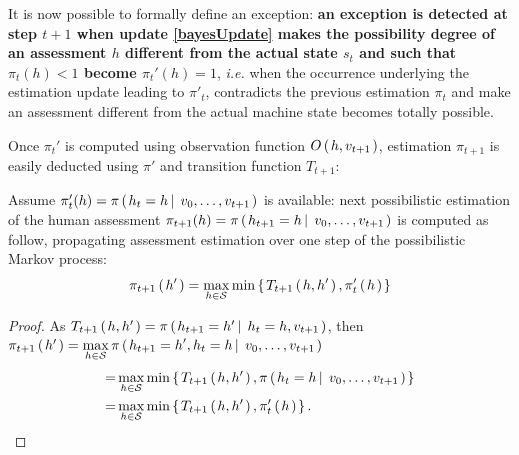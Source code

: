 It is now possible to formally define an exception: 
\textbf{an exception is detected at step $t+1$ 
when update \ref{bayesUpdate} 
makes the possibility degree of an assessment $h$
different from the actual state $s_t$ and 
such that $\pi_t(h)<1$ 
become $\pi_t'(h)=1$}, 
\textit{i.e.} when the occurrence underlying 
the estimation update leading to $\pi'_t$,
contradicts the previous estimation $\pi_t$ and
make an assessment different from the actual machine
state becomes totally possible.

Once $\pi_t'$ is computed 
using observation function $O \left( \left. h,v_{t+1} \right. \right)$, 
estimation $\pi_{t+1}$ is easily deducted 
using $\pi'$ and transition function $T_{t+1}$:
\begin{theorem}
Assume $\pi_t'(h)=\pi \left( \left.  h_t=h \, \right| \left. \, v_0, \ldots, v_{t+1}  \right. \right)$ 
is available: 
next possibilistic estimation of the human assessment 
$\pi_{t+1}(h) = \pi \left( \left.  h_{t+1} = h \, \right| \left. \, v_0, \ldots, v_{t+1}  \right. \right)$ 
is computed as follow, propagating assessment estimation
over one step of the possibilistic Markov process:
\begin{equation} 
\label{recestimH}
\pi_{t+1} \left( \left. h' \right. \right) = \max_{h \in \mathcal{S}} \min \left\{ \left.  T_{t+1} \left( \left. h, h' \right. \right), \pi_t' \left( \left.  h  \right. \right)   \right. \right\} 
\end{equation}
\label{estimHMI}
\end{theorem}
\begin{proof}
As $T_{t+1} \left( \left. h, h' \right. \right) =\pi \left( \left.  h_{t+1} = h' \, \right| \left. \, h_t=h, v_{t+1}   \right. \right)$, then
$\pi_{t+1} \left( \left.  h'  \right. \right) =  \displaystyle \max_{h \in \mathcal{S}} \pi \left( \left.  h_{t+1} = h', h_t = h \, \right| \left. \, v_0, \ldots, v_{t+1}  \right. \right) $	
\begin{eqnarray*}
 = & \displaystyle \max_{h \in \mathcal{S}} \min \left\{ \left.  T_{t+1} \left( \left.  h, h'  \right. \right), \pi \left( \left.  h_t = h \, \right| \left. \, v_0, \ldots, v_{t+1}  \right. \right)  \right. \right\} \\
 = & \displaystyle \max_{h \in \mathcal{S}} \min \left\{ \left.  T_{t+1} \left( \left.  h, h'  \right. \right), \pi_{t}' \left( \left. h \right. \right)   \right. \right\}.
\end{eqnarray*}
\end{proof}

